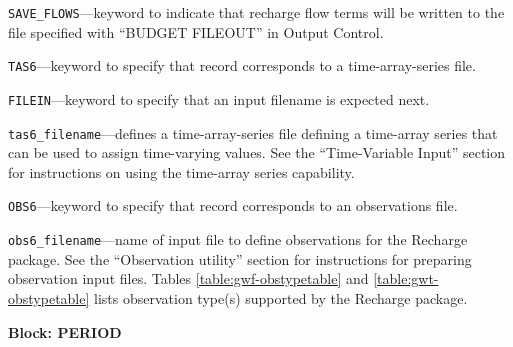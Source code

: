 \begin{description}
\item \texttt{SAVE\_FLOWS}---keyword to indicate that recharge flow terms will be written to the file specified with ``BUDGET FILEOUT'' in Output Control.

\item \texttt{TAS6}---keyword to specify that record corresponds to a time-array-series file.

\item \texttt{FILEIN}---keyword to specify that an input filename is expected next.

\item \texttt{tas6\_filename}---defines a time-array-series file defining a time-array series that can be used to assign time-varying values. See the ``Time-Variable Input'' section for instructions on using the time-array series capability.

\item \texttt{OBS6}---keyword to specify that record corresponds to an observations file.

\item \texttt{obs6\_filename}---name of input file to define observations for the Recharge package. See the ``Observation utility'' section for instructions for preparing observation input files. Tables \ref{table:gwf-obstypetable} and \ref{table:gwt-obstypetable} lists observation type(s) supported by the Recharge package.

\end{description}
\item \textbf{Block: PERIOD}

